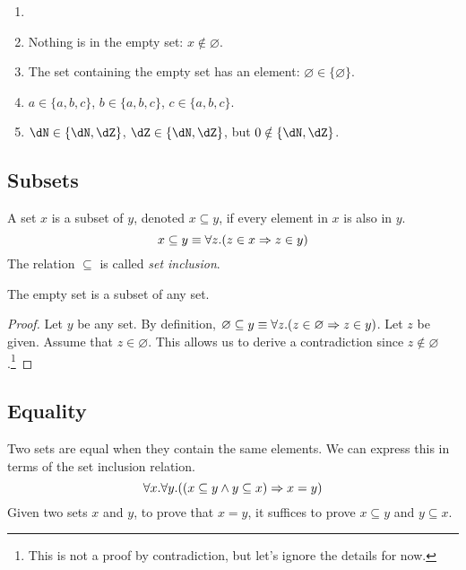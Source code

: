 \documentclass{amsart}
\begin{document}
\begin{eg}
  \begin{enumerate}
  \item[]
  \item Nothing is in the empty set: $x \notin \varnothing$.
  \item The set containing the empty set has an element: $\varnothing \in \{\varnothing\}$.
  \item $a \in \{ a, b, c \}$, $b \in \{ a, b, c \}$, $c \in \{ a, b, c \}$.
  \item $\dN \in \{ \dN, \dZ \}$, $\dZ \in \{ \dN, \dZ \}$, but $0 \notin \{ \dN,\dZ \}$.
  \end{enumerate}
\end{eg}

\subsection{Subsets}
\label{sec:subsets}

\begin{defn}
  A set $x$ is a subset of $y$, denoted $x \subseteq y$, if every element in $x$ is also in $y$.
  \[
    x \subseteq y \equiv \forall z.(z \in x \Rightarrow z \in y)
  \]
  The relation $\subseteq$ is called \emph{set inclusion}.
\end{defn}

\begin{eg}
  The empty set is a subset of any set.
\end{eg}
\begin{proof}
  Let $y$ be any set.
  By definition, $\varnothing \subseteq y \equiv \forall z.(z \in \varnothing \Rightarrow z \in y)$.
  Let $z$ be given.
  Assume that $z \in \varnothing$.
  This allows us to derive a contradiction since $z \notin \varnothing$.\footnote{This is not a proof by contradiction, but let's ignore the details for now.}
\end{proof}

\subsection{Equality}
\label{sec:equality}

Two sets are equal when they contain the same elements.
We can express this in terms of the set inclusion relation.
\[
  \forall x. \forall y. ((x \subseteq y \wedge y \subseteq x) \Rightarrow x = y)
\]
Given two sets $x$ and $y$, to prove that $x = y$, it suffices to prove $x \subseteq y$ and $y \subseteq x$.
\end{document}
